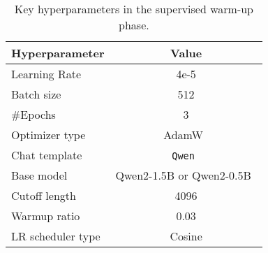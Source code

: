 \begin{table}[h]
\centering
\caption{Key hyperparameters in the supervised warm-up phase.}
\label{tab:sft_params} 
\begin{tabular}{@{}lc@{}}
\toprule
\textbf{Hyperparameter} & \textbf{Value}                         \\ \midrule
Learning Rate           & 4e-5                                   \\
Batch size              & 512                                    \\
\#Epochs                & 3                                      \\
Optimizer type          & AdamW~\citep{LoshchilovH19}            \\
Chat template           & \texttt{Qwen}~\citep{qwen2}            \\
Base model              & Qwen2-1.5B or Qwen2-0.5B~\citep{qwen2} \\
Cutoff length           & 4096                                   \\
Warmup ratio            & 0.03                                   \\
LR scheduler type       & Cosine                                 \\ \bottomrule
\end{tabular}
\end{table}